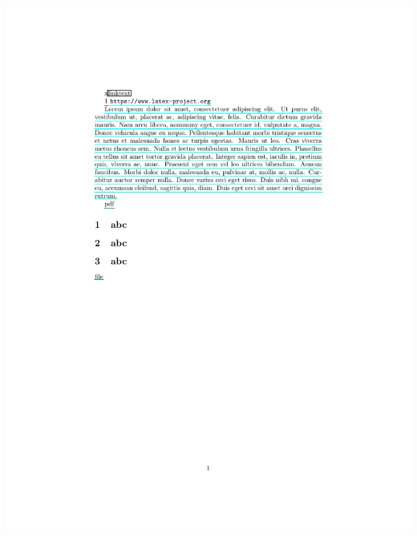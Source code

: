 \documentclass{article}
\begin{document}
\includegraphics[scale=0.5,trim=4cm 15cm 8cm 3cm,clip,page=1]{pax-input}


\end{document}
